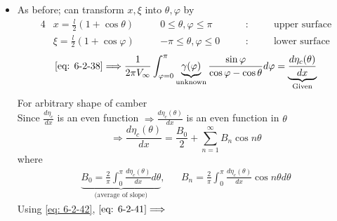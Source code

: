 \begin{itemize}
\begin{equation}
\label{eq: 6-2-36}
\end{equation}
\begin{equation}
C_M = \frac{M}{\frac{\rho}{2}V_\infty^2l^2} = \frac{-2}{V_\infty l^2}\int_0^l\gamma(x)xdx
\label{eq: 6-2-37}
\end{equation}
Now $\gamma(x)$ has to be determined from B.C. \eqref{eq: 6-2-26a}
\begin{align}
v(x,0^\pm) 
&= \lim_{y\to 0^\pm} \left[-\frac{1}{2\pi}\int_0^l\gamma(\xi)\frac{x-\xi}{\left(x-\xi\right)^2+y^2}d\xi\right] = \underbrace{V_\infty\frac{d\eta_c}{dx}}_{\text{Given}}\phantom{-}(0\leq x\leq l) \nonumber\\
&= - \frac{1}{2\pi}\int_0^l\gamma(\xi)\frac{d\xi}{x-\xi} = V_\infty\frac{d\eta_c}{dx}\phantom{-}(0\leq x\leq l) \label{eq: 6-2-38}
\end{align}
(Singular integral/Hilbert integral)
\item As before; can transform $x,\xi$ into $\theta,\varphi$ by
\begin{alignat*}{4}
& x = \frac{l}{2}\left(1+\cos\theta\right)     \quad && 0\leq\theta,\varphi\leq\pi \quad && \colon \quad && \text{upper surface}\\
& \xi = \frac{l}{2}\left(1+\cos\varphi\right)     \quad && -\pi\leq\theta,\varphi\leq 0 \quad && \colon \quad && \text{lower surface}
\end{alignat*}
\begin{equation}
\eqref{eq: 6-2-38}\Longrightarrow\frac{1}{2\pi V_\infty}\int_{\varphi = 0}^\pi\underbrace{\gamma(\varphi)}_{\text{unknown}}\frac{\sin\varphi}{\cos\varphi-\cos\theta}d\varphi = \underbrace{\frac{d\eta_c(\theta)}{dx}}_{\text{Given}}
\label{eq: 6-2-41}
\end{equation}
For arbitrary shape of camber\\
Since $\displaystyle\frac{d\eta_c}{dx}$ is an even function $\Longrightarrow\displaystyle\frac{d\eta_c(\theta)}{dx}$ is an even function in $\theta$
\begin{equation}
\Longrightarrow\frac{d\eta_c(\theta)}{dx} = \frac{B_0}{2} + \sum_{n=1}^\infty B_n\cos n\theta
\label{eq: 6-2-42}
\end{equation}
where 
\begin{align*}
\underbrace{B_0 = \frac{2}{\pi}\int_0^\pi\frac{d\eta_c(\theta)}{dx}d\theta}_{\text{(average of slope)}}, &&B_n = \frac{2}{\pi}\int_0^\pi\frac{d\eta_c(\theta)}{dx}\cos n\theta d\theta
\end{align*}
Using \eqref{eq: 6-2-42}, $\eqref{eq: 6-2-41}\Longrightarrow$
\begin{equation}

\end{equation}
\end{itemize}
